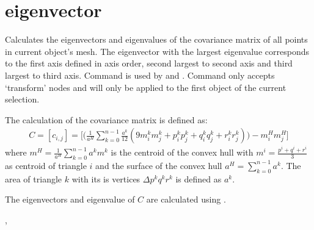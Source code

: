 \documentclass[letterpaper,10pt,english]{sphinxmanual}
\begin{document}
\section{eigenvector}
\label{\detokenize{pk_src.eigenvector::doc}}\label{\detokenize{pk_src.eigenvector:eigenvector}}\label{\detokenize{pk_src.eigenvector:id1}}
{\hyperref[\detokenize{index:commands}]{}}
\label{\detokenize{pk_src.eigenvector:module-pk_src.eigenvector}}
Calculates the eigenvectors and eigenvalues of the covariance matrix of all points in current object’s mesh. The eigenvector with the largest eigenvalue corresponds to the first axis defined in axis order, second largest to second axis and third largest to third axis. Command is used by {\hyperref[\detokenize{pk_src.alignObj:alignobj}]{}} and {\hyperref[\detokenize{pk_src.exportData:exportdata}]{}}.
Command only accepts ‘transform’ nodes and will only be applied to the first object of the current selection.

The calculation of the covariance matrix is defined as:
\begin{equation*}
\begin{split}C = [c_{i,j}] = \biggl[ \biggl (  \frac{1}{a^H}\sum\limits_{k=0}^{n-1}\frac{a^k}{12}(9m_i^km_j^k + p_i^kp_j^k + q_i^kq_j^k + r_i^kr_j^k) \biggr ) - m_i^Hm_j^H \biggr]\end{split}
\end{equation*}
where \(m^H = \frac {1}{a^H}\sum\limits_{k=0}^{n-1}a^km^k\) is the centroid of the convex hull with \(m^i = \frac{p^i+q^i+r^i}3\) as centroid of triangle \(i\) and the surface of the convex hull \(a^H = \sum\limits_{k=0}^{n-1}a^k\). The area of triangle \(k\) with its is vertices \(\Delta p^kq^kr^k\) is defined as \(a^k\).

The eigenvectors and eigenvalue of \(C\) are calculated using .

 {\hyperref[\detokenize{pk_src.alignObj:alignobj}]{}}, {\hyperref[\detokenize{pk_src.exportData:exportdata}]{}}
\end{document}

